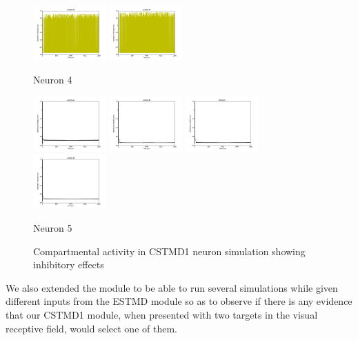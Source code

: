 \documentclass[a4paper,11pt]{article}
\begin{document}
\begin{figure}[H]
\begin{minipage}{0.18\textwidth}
\includegraphics[width = 1.1in]{cstmd_comp14} 
\includegraphics[width = 1.1in]{cstmd_comp15}
\caption* {Neuron 4}
\end{minipage}
\begin{minipage}{0.18\textwidth}
\includegraphics[width = 1.1in]{cstmd_comp16} 
\includegraphics[width = 1.1in]{cstmd_comp17} 
\includegraphics[width = 1.1in]{cstmd_comp18} 
\includegraphics[width = 1.1in]{cstmd_comp19}
\caption* {Neuron 5}
\end{minipage}
\caption{Compartmental activity in CSTMD1 neuron simulation showing inhibitory effects}
\end{figure}

We also extended the module to be able to run several simulations while given different inputs from the ESTMD module so as to observe if there is any evidence that our CSTMD1 module, when presented with two targets in the visual receptive field, would select one of them.
\end{document}
